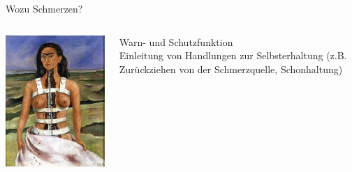 \documentclass{beamer}
\begin{document}
\begin{frame}{Wozu Schmerzen?}


\begin{columns}[c]
\begin{column}{5cm}

\begin{center}
    \includegraphics[width=\textwidth]{The_Broken_Column.jpg}
\end{center}

\end{column}


\pause

\begin{column}{5cm}

Warn- und Schutzfunktion \\

Einleitung von Handlungen zur Selbsterhaltung (z.B. Zurückziehen von der Schmerzquelle, Schonhaltung)

\end{column}

\end{columns}
    
\end{frame}
\end{document}
